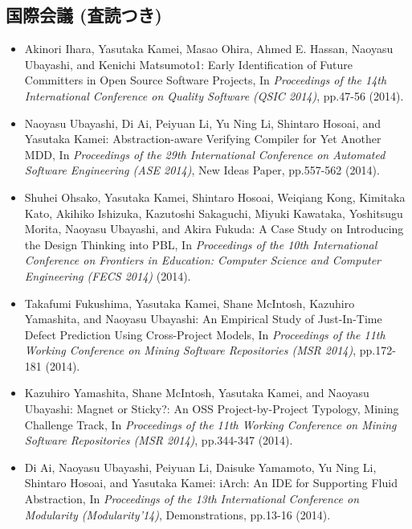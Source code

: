 \documentclass{jarticle}
\begin{document}
\subsection{国際会議 (査読つき)}

\begin{itemize}
\item Akinori Ihara, Yasutaka Kamei, Masao Ohira, Ahmed E. Hassan, Naoyasu Ubayashi, and Kenichi Matsumoto1:
Early Identification of Future Committers in Open Source Software Projects,
In {\em Proceedings of the 14th International Conference on Quality Software (QSIC 2014)}, pp.47-56 (2014).

\item Naoyasu Ubayashi, Di Ai, Peiyuan Li, Yu Ning Li, Shintaro Hosoai, and Yasutaka Kamei:
Abstraction-aware Verifying Compiler for Yet Another MDD,
In {\em Proceedings of the 29th International Conference on Automated Software Engineering (ASE 2014)}, New Ideas Paper, pp.557-562 (2014).

\item Shuhei Ohsako, Yasutaka Kamei, Shintaro Hosoai, Weiqiang Kong, Kimitaka Kato, Akihiko Ishizuka, Kazutoshi Sakaguchi, Miyuki Kawataka, Yoshitsugu Morita, Naoyasu Ubayashi, and Akira Fukuda:
A Case Study on Introducing the Design Thinking into PBL,
In {\em Proceedings of the 10th International Conference on Frontiers in Education: Computer Science and Computer Engineering  (FECS 2014)} (2014).

\item Takafumi Fukushima, Yasutaka Kamei, Shane McIntosh, Kazuhiro Yamashita, and Naoyasu Ubayashi:
An Empirical Study of Just-In-Time Defect Prediction Using Cross-Project Models,
In {\em Proceedings of the 11th Working Conference on Mining Software Repositories (MSR 2014)}, pp.172-181 (2014).

\item Kazuhiro Yamashita, Shane McIntosh, Yasutaka Kamei, and Naoyasu Ubayashi:
Magnet or Sticky?: An OSS Project-by-Project Typology,
Mining Challenge Track,
In {\em Proceedings of the 11th Working Conference on Mining Software Repositories (MSR 2014)}, pp.344-347 (2014).

\item Di Ai, Naoyasu Ubayashi, Peiyuan Li, Daisuke Yamamoto, Yu Ning Li, Shintaro Hosoai, and Yasutaka Kamei:
iArch: An IDE for Supporting Fluid Abstraction,
In {\em Proceedings of the 13th International Conference on Modularity (Modularity'14)}, Demonstrations, pp.13-16 (2014).


\end{itemize}
\end{document}
